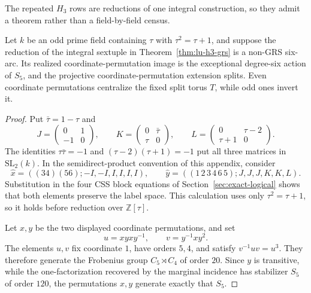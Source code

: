 The repeated \(H_3\) rows are reductions of one integral construction, so
they admit a theorem rather than a field-by-field census.

\begin{theorem}
\label{thm:h3-party-extension}
Let \(k\) be an odd prime field containing
\(\tau\) with \(\tau^2=\tau+1\), and suppose the reduction of the integral
sextuple in Theorem~\ref{thm:lu-h3-grs} is a non-GRS six-arc.  Its realized
coordinate-permutation image is the exceptional degree-six action of
\(S_5\), and the projective coordinate-permutation extension splits.  Even
coordinate permutations centralize the fixed split torus \(T\), while odd
ones invert it.
\end{theorem}

\begin{proof}
Put \(\bar\tau=1-\tau\) and
\[
 J=\begin{pmatrix}0&1\\-1&0\end{pmatrix},\qquad
 K=\begin{pmatrix}0&\bar\tau\\\tau&0\end{pmatrix},\qquad
 L=\begin{pmatrix}0&\tau-2\\\tau+1&0\end{pmatrix}.
\]
The identities \(\tau\bar\tau=-1\) and
\((\tau-2)(\tau+1)=-1\) put all three matrices in
\(\mathrm{SL}_2(k)\).  In the semidirect-product convention of this
appendix, consider
\[
 \widehat x=((34)(56);-I,-I,I,I,I,I),\qquad
 \widehat y=((1\,2\,3\,4\,6\,5);J,J,J,K,K,L).
\]
Substitution in the four CSS block equations of
Section~\ref{sec:exact-logical} shows that both elements preserve the label
space.  This calculation uses only \(\tau^2=\tau+1\), so it holds before
reduction over \(\mathbb Z[\tau]\).

Let \(x,y\) be the two displayed coordinate permutations, and set
\[
 u=xyxy^{-1},\qquad v=y^{-1}xy^2.
\]
The elements \(u,v\) fix coordinate \(1\), have orders \(5,4\), and satisfy
\(v^{-1}uv=u^3\).  They therefore generate the Frobenius group
\(C_5\rtimes C_4\) of order \(20\).  Since \(y\) is transitive, while the
one-factorization recovered by the marginal incidence has stabilizer
\(S_5\) of order \(120\), the permutations \(x,y\) generate exactly that
\(S_5\).


\end{proof}
